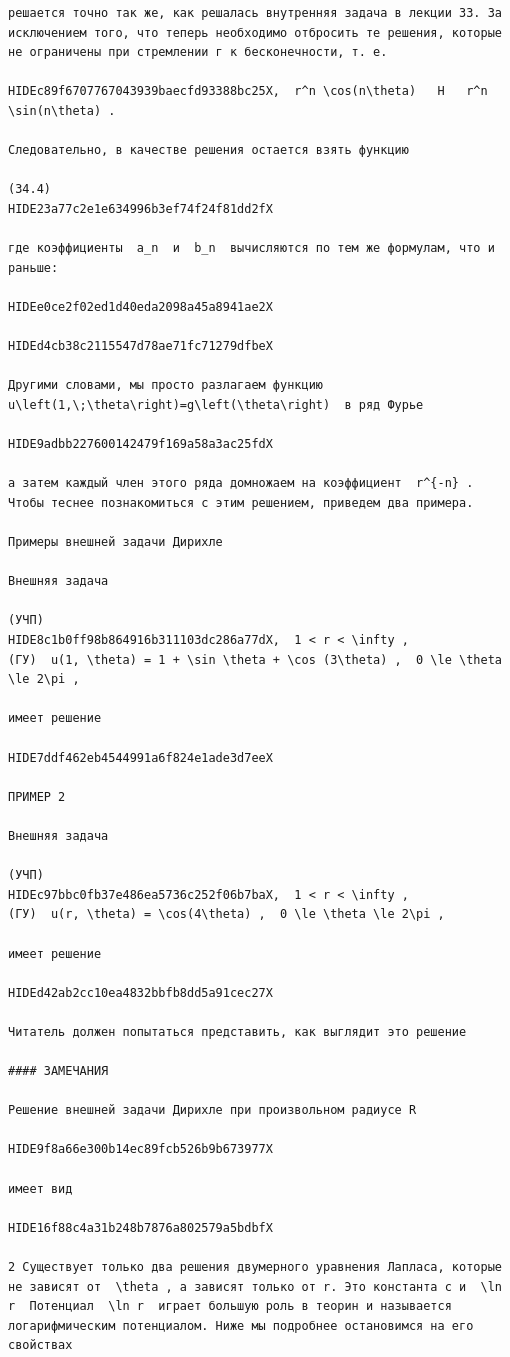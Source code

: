\documentclass[
  ukrainian,
]{article}
\begin{document}
\begin{verbatim}
решается точно так же, как решалась внутренняя задача в лекции 33. За исключением того, что теперь необходимо отбросить те решения, которые не ограничены при стремлении г к бесконечности, т. е.

HIDEc89f6707767043939baecfd93388bc25X,  r^n \cos(n\theta)   H   r^n \sin(n\theta) .

Следовательно, в качестве решения остается взять функцию

(34.4) 
HIDE23a77c2e1e634996b3ef74f24f81dd2fX

где коэффициенты  a_n  и  b_n  вычисляются по тем же формулам, что и раньше:

HIDEe0ce2f02ed1d40eda2098a45a8941ae2X

HIDEd4cb38c2115547d78ae71fc71279dfbeX

Другими словами, мы просто разлагаем функцию  u\left(1,\;\theta\right)=g\left(\theta\right)  в ряд Фурье

HIDE9adbb227600142479f169a58a3ac25fdX

а затем каждый член этого ряда домножаем на коэффициент  r^{-n} . Чтобы теснее познакомиться с этим решением, приведем два примера.

Примеры внешней задачи Дирихле

Внешняя задача

(УЧП) 
HIDE8c1b0ff98b864916b311103dc286a77dX,  1 < r < \infty ,  
(ГУ)  u(1, \theta) = 1 + \sin \theta + \cos (3\theta) ,  0 \le \theta \le 2\pi ,

имеет решение

HIDE7ddf462eb4544991a6f824e1ade3d7eeX

ПРИМЕР 2

Внешняя задача

(УЧП) 
HIDEc97bbc0fb37e486ea5736c252f06b7baX,  1 < r < \infty ,  
(ГУ)  u(r, \theta) = \cos(4\theta) ,  0 \le \theta \le 2\pi ,

имеет решение

HIDEd42ab2cc10ea4832bbfb8dd5a91cec27X

Читатель должен попытаться представить, как выглядит это решение

#### ЗАМЕЧАНИЯ

Решение внешней задачи Дирихле при произвольном радиусе R

HIDE9f8a66e300b14ec89fcb526b9b673977X

имеет вид

HIDE16f88c4a31b248b7876a802579a5bdbfX

2 Существует только два решения двумерного уравнения Лапласа, которые не зависят от  \theta , а зависят только от r. Это константа c и  \ln r  Потенциал  \ln r  играет большую роль в теорин и называется логарифмическим потенциалом. Ниже мы подробнее остановимся на его свойствах


\end{verbatim}
\end{document}
